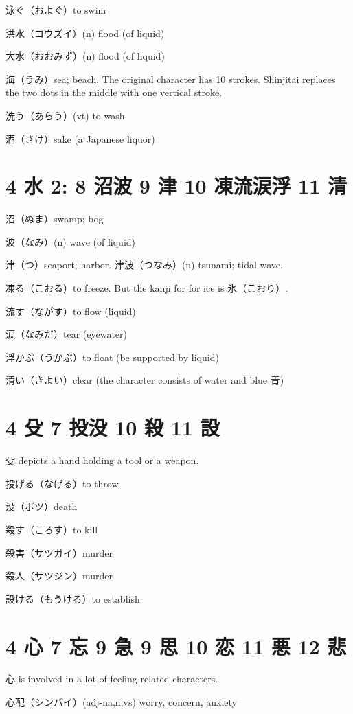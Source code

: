 泳ぐ（およぐ）to swim

洪水（コウズイ）(n) flood (of liquid)

大水（おおみず）(n) flood (of liquid)

海（うみ）sea; beach.
The original character has 10 strokes.
Shinjitai replaces the two dots in the middle
with one vertical stroke.

洗う（あらう）(vt) to wash

酒（さけ）sake (a Japanese liquor)

\section{4 水 2: 8 沼波 9 津 10 凍流涙浮 11 清}

沼（ぬま）swamp; bog

波（なみ）(n) wave (of liquid)

津（つ）seaport; harbor.
津波（つなみ）(n) tsunami; tidal wave.

凍る（こおる）to freeze.
But the kanji for for ice is 氷（こおり）.

流す（ながす）to flow (liquid)

涙（なみだ）tear (eyewater)

浮かぶ（うかぶ）to float (be supported by liquid)

清い（きよい）clear (the character consists of water and blue 青)

\section{4 殳 7 投没 10 殺 11 設}

殳 depicts a hand holding a tool or a weapon.

投げる（なげる）to throw

没（ボツ）death

殺す（ころす）to kill

殺害（サツガイ）murder

殺人（サツジン）murder

設ける（もうける）to establish

\section{4 心 7 忘 9 急 9 思 10 恋 11 悪 12 悲}

心 is involved in a lot of feeling-related characters.

心配（シンパイ）(adj-na,n,vs) worry, concern, anxiety

